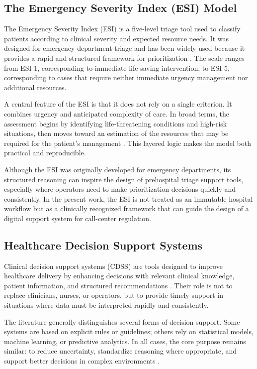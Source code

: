 \documentclass[a4paper,12pt,oneside]{report}
\begin{document}
\subsection{The Emergency Severity Index (ESI) Model}

The Emergency Severity Index (ESI) is a five-level triage tool used to classify patients according to clinical severity and expected resource needs. It was designed for emergency department triage and has been widely used because it provides a rapid and structured framework for prioritization \cite{gilboy2011,esi5handbook}. The scale ranges from ESI-1, corresponding to immediate life-saving intervention, to ESI-5, corresponding to cases that require neither immediate urgency management nor additional resources.

A central feature of the ESI is that it does not rely on a single criterion. It combines urgency and anticipated complexity of care. In broad terms, the assessment begins by identifying life-threatening conditions and high-risk situations, then moves toward an estimation of the resources that may be required for the patient's management \cite{gilboy2011}. This layered logic makes the model both practical and reproducible.

Although the ESI was originally developed for emergency departments, its structured reasoning can inspire the design of prehospital triage support tools, especially where operators need to make prioritization decisions quickly and consistently. In the present work, the ESI is not treated as an immutable hospital workflow but as a clinically recognized framework that can guide the design of a digital support system for call-center regulation.

\subsection{Healthcare Decision Support Systems}

Clinical decision support systems (CDSS) are tools designed to improve healthcare delivery by enhancing decisions with relevant clinical knowledge, patient information, and structured recommendations \cite{sutton2020,wasylewicz2018}. Their role is not to replace clinicians, nurses, or operators, but to provide timely support in situations where data must be interpreted rapidly and consistently.

The literature generally distinguishes several forms of decision support. Some systems are based on explicit rules or guidelines; others rely on statistical models, machine learning, or predictive analytics. In all cases, the core purpose remains similar: to reduce uncertainty, standardize reasoning where appropriate, and support better decisions in complex environments \cite{teufel2021,chen2023}.
\end{document}
